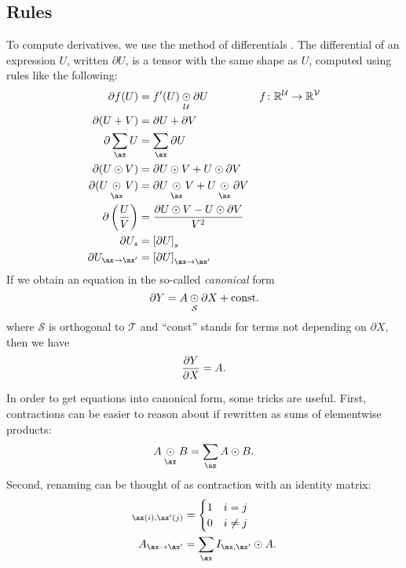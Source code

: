 \subsection{Rules}

To compute derivatives, we use the method of differentials \citep{magnus+neudecker:1985}. The differential of an expression $U$, written $\partial U$, is a tensor with the same shape as $U$, computed using rules like the following:
\begin{align*}
  \partial f(U) &= f'(U) \ndot{\mathcal{U}} \partial U && f \colon \reals^\mathcal{U} \rightarrow \reals^{\mathcal{V}} \\
  \partial (U + V) &= \partial U + \partial V \\
  \partial \nsum{\ax} U &= \nsum{\ax} \partial U \\
  \partial (U \odot V) &= \partial U \odot V + U \odot \partial V \\
  \partial (U \ndot{\ax} V) &= \partial U \ndot{\ax} V + U \ndot{\ax} \partial V \\
  \partial \left(\frac{U}{V}\right) &= \frac{\partial U \odot V - U \odot \partial V}{V^2} \\
  \partial U_s &= \left[\partial U\right]_s \\
  \partial U_{\ax\rightarrow\ax'} &= \left[\partial U\right]_{\ax\rightarrow\ax'}
\end{align*}
If we obtain an equation in the so-called \emph{canonical} form
\begin{equation}
  \partial Y = A \ndot{\mathcal{S}} \partial X + \text{const.}
  \label{eq:canonical}
\end{equation}
where $\mathcal{S}$ is orthogonal to $\mathcal{T}$ and ``const'' stands for terms not depending on $\partial X$, then we have
\begin{equation*}
  \frac{\partial Y}{\partial X} = A.
\end{equation*}

In order to get equations into canonical form, some tricks are useful. First, contractions can be easier to reason about if rewritten as sums of elementwise products:
\[ A \ndot{\ax} B = \nsum{\ax} A \odot B. \]
Second, renaming can be thought of as contraction with an identity matrix:
\begin{align*}
[I_{\ax,\ax'}]_{\ax(i),\ax'(j)} &= \begin{cases} 1 & i = j \\ 0 & i \neq j \end{cases} \\
A_{\ax\rightarrow\ax'} &= \nsum{\ax} I_{\ax,\ax'} \odot A.
\end{align*}

